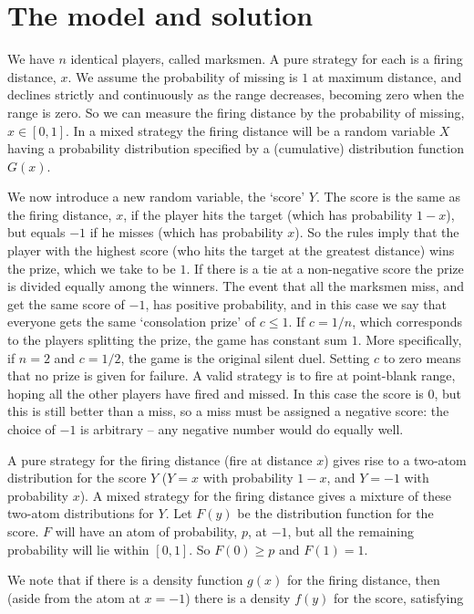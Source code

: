 \documentclass[11pt,a4paper]{article}%
\numberwithin{equation}{section}
\theoremstyle{plain}
\begin{document}
\section{The model and solution}
%
We have $n$ identical players, called marksmen. A pure strategy for each is a firing distance, $x$. We assume the probability of missing is $1$ at maximum distance, and declines strictly and  continuously as the range decreases, becoming zero when the range is zero. So we can measure the firing distance by the probability of missing, $x\in [0,1]$. In a mixed strategy the firing distance will be a random variable $X$ having a probability distribution specified by a (cumulative) distribution function $G(x)$.
%
\par
We now introduce a new random variable, the `score' $Y$. The score is the same as the firing distance, $x$, if the player hits the target (which has probability $1-x$), but equals $-1$ if he misses (which has probability $x$). So the rules imply that the player with the highest score (who hits the target at the greatest distance) wins the prize, which we take to be $1$. If there is a tie at a non-negative score the prize is divided equally among the winners. The event that all the marksmen miss, and get the same score of $-1$, has positive probability, and in this case we say that everyone gets the same `consolation prize' of $c\leqslant 1$. If $c=1/n$, which corresponds to the players splitting the prize, the game has constant sum $1$. More specifically, if $n=2$ and $c=1/2$, the game is the original silent duel. Setting $c$ to zero means that no prize is given for failure. A valid strategy is to fire at point-blank range, hoping all the other players have fired and missed. In this case the score is $0$, but this is still better than a miss, so a miss must be assigned a negative score: the choice of $-1$ is arbitrary -- any negative number would do equally well.
%
\par
A pure strategy for the firing distance (fire at distance $x$) gives rise to a two-atom distribution for the score $Y$ ($Y = x$ with probability $1 - x$, and $Y = -1$ with probability $x$). A mixed strategy for the firing distance gives a mixture of these two-atom distributions for $Y$. Let $F(y)$ be the distribution function for the score. $F$ will have an atom of probability, $p$, at $-1$, but all the remaining probability will lie within $[0, 1]$. So $F(0) \geqslant p$ and $F(1) = 1$.
%
\par
We note that if there is a density function $g(x)$ for the firing distance, then (aside from the atom at $x=-1$) there is a density $f(y)$ for the score, satisfying
\end{document}
